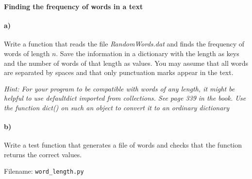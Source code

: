 \begin{Problem}{\textbf{Finding the frequency of words in a text}} \label{prob64}

\paragraph{a)}
Write a function that reads the file \emph{RandomWords.dat} and finds the frequency
of words of length $n$. Save the information in a dictionary with the length
as keys and the number of words of that length as values.  You may assume that
all words are separated by spaces and that only punctuation marks appear in the
text.

\emph{Hint: For your program to be compatible with words of any length, it might
be helpful to use defaultdict imported from collections. See page 339 in the book.
Use the function dict() on such an object to convert it to an ordinary dictionary}
\paragraph{b)}
Write a test function that generates a file of words and checks that the function
returns the correct values.

Filename: \texttt{word\_length.py}
\end{Problem}
\newpage 


